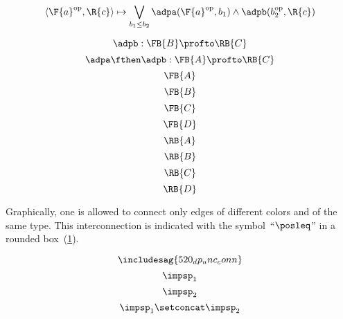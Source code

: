 {\begin{forslides}
\begin{equation}\label{eq:adp12pfexpr}
\langle\F{a}^{\text{op}}, \R{c}\rangle \mapsto \bigvee_{b_1\leq b_2} \adpa(\F{a}^{\text{op}}, b_1) \wedge \adpb(b_2^{\text{op}}, \R{c})
\end{equation}

\begin{equation}\label{eq:adp2}
\adpb: \FB{B} \profto  \RB{C}
\end{equation}
\begin{equation}\label{eq:adp1adp2}
\adpa\fthen\adpb: \FB{A} \profto  \RB{C}
\end{equation}
\begin{equation}\label{eq:FA}
\FB{A}
\end{equation}
\begin{equation}\label{eq:FB}
\FB{B}
\end{equation}
\begin{equation}\label{eq:FC}
\FB{C}
\end{equation}
\begin{equation}\label{eq:FD}
\FB{D}
\end{equation}
\begin{equation}\label{eq:RA}
\RB{A}
\end{equation}
\begin{equation}\label{eq:RB}
\RB{B}
\end{equation}
\begin{equation}\label{eq:RC}
\RB{C}
\end{equation}
\begin{equation}\label{eq:RD}
\RB{D}
\end{equation}
\end{forslides}
}


Graphically, one is allowed to connect only edges of different colors and of the same type.
This interconnection is indicated with the symbol~``$\posleq$'' in a rounded box~(\cref{fig:connection}).

\begin{figure}[h]
  \centering
  \caption{\label{fig:connection}}
\end{figure}

\begin{equation}
  \includesag{520_dp_unc_conn}
\end{equation}
\begin{equation}
  \label{eq:impsp1}
  \impsp_1
\end{equation}
\begin{equation}
  \label{eq:impsp2}
  \impsp_2
\end{equation}
\begin{equation}\label{eq:impsp12}
\impsp_{1} \setconcat \impsp_{2}
\end{equation}

